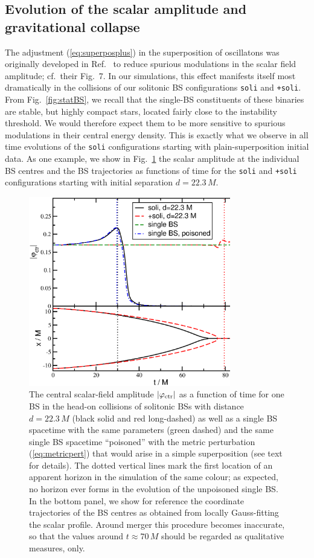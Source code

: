 \documentclass[]{iopart}
\begin{document}
\subsection{Evolution of the scalar amplitude and gravitational collapse}
%
The adjustment (\ref{eq:superposplus}) in the superposition of oscillatons
was originally developed in Ref.~\cite{Helfer:2018vtq} to reduce
spurious modulations in the scalar field amplitude; cf.~their
Fig.~7. In our simulations, this effect manifests itself
most dramatically in the collisions of our solitonic BS
configurations {\tt soli} and {\tt +soli}.
From Fig.~\ref{fig:statBS}, we recall that the single-BS constituents
of these binaries are stable, but highly compact stars, located
fairly close to the instability threshold. We would therefore expect
them to be more sensitive to spurious modulations in their central
energy density. This is exactly what we observe in all time evolutions
of the {\tt soli} configurations starting with plain-superposition
initial data. As one example, we show
in Fig.~\ref{fig:soli_ampctr} the scalar amplitude
at the individual BS centres and the BS trajectories
as functions of time for the
{\tt soli} and {\tt +soli} configurations starting with initial
separation $d=22.3\,M$.
%
\begin{figure}
    \centering
    \includegraphics[width=250pt]{ampctr_sBS.eps}
    \caption{The central scalar-field amplitude $|\varphi_{\rm ctr}|$ 
    as a function of time for one BS in the head-on
    collisions of solitonic BSs with distance $d=22.3\,M$
    (black solid and red long-dashed) as well as a single
    BS spacetime with the same parameters (green dashed)
    and the same single BS spacetime ``poisoned'' with
    the metric perturbation (\ref{eq:metricpert}) that would arise in a simple
    superposition (see text for details). The dotted
    vertical lines mark the first location of an
    apparent horizon in the simulation of the same colour;
    as expected, no horizon ever forms in the evolution
    of the unpoisoned single BS.
    In the bottom panel, we show for reference the coordinate
    trajectories of the BS centres as obtained from locally
    Gauss-fitting the scalar profile. Around merger this procedure
    becomes inaccurate, so that the values around $t\approx 70\,M$
    should be regarded as qualitative measures, only.
    }
    \label{fig:soli_ampctr}
\end{figure}
\end{document}
